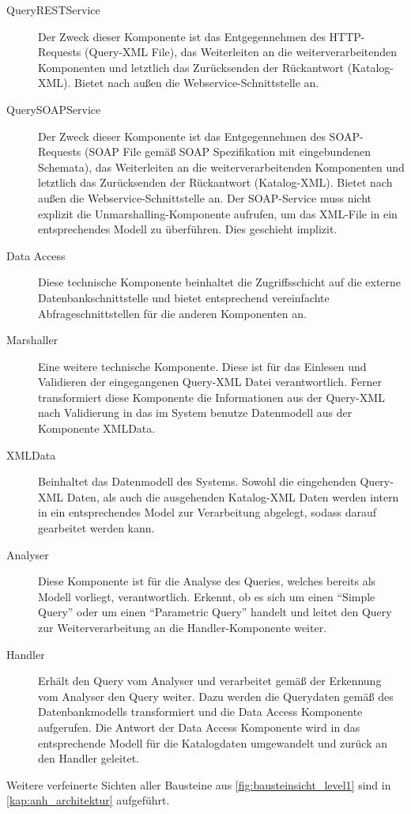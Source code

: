 \begin{description}
\item[QueryRESTService] Der Zweck dieser Komponente ist das Entgegennehmen des HTTP-Requests (Query-XML File), das Weiterleiten an die weiterverarbeitenden Komponenten und letztlich das Zurücksenden der Rückantwort (Katalog-XML). Bietet nach außen die \gls{Webservice}-Schnittstelle an.
\item[QuerySOAPService] Der Zweck dieser Komponente ist das Entgegennehmen des SOAP-Requests (SOAP File gemäß SOAP Spezifikation mit eingebundenen Schemata), das Weiterleiten an die weiterverarbeitenden Komponenten und letztlich das Zurücksenden der Rückantwort (Katalog-XML). Bietet nach außen die \gls{Webservice}-Schnittstelle an.
Der SOAP-Service muss nicht explizit die Unmarshalling-Komponente aufrufen, um das XML-File in ein entsprechendes Modell zu überführen. Dies geschieht implizit. 
\item[Data Access] Diese technische Komponente beinhaltet die Zugriffsschicht auf die externe Datenbankschnittstelle und bietet entsprechend vereinfachte Abfrageschnittstellen für die anderen Komponenten an. 
\item[Marshaller] Eine weitere technische Komponente. Diese ist für das Einlesen und Validieren der eingegangenen Query-XML Datei verantwortlich. Ferner transformiert diese Komponente die Informationen aus der Query-XML nach Validierung in das im System benutze Datenmodell aus der Komponente XMLData.
\item[XMLData] Beinhaltet das Datenmodell des Systems. Sowohl die eingehenden Query-XML Daten, als auch die ausgehenden Katalog-XML Daten werden intern in ein entsprechendes Model zur Verarbeitung abgelegt, sodass darauf gearbeitet werden kann.  
\item[Analyser] Diese Komponente ist für die Analyse des Queries, welches bereits als Modell vorliegt, verantwortlich. Erkennt, ob es sich um einen \enquote{Simple Query} oder um einen \enquote{Parametric Query} handelt und leitet den Query zur Weiterverarbeitung an die Handler-Komponente weiter. 
\item[Handler] Erhält den Query vom Analyser und verarbeitet gemäß der Erkennung vom Analyser den Query weiter. Dazu werden die Querydaten gemäß des Datenbankmodells transformiert und die Data Access Komponente aufgerufen. Die Antwort der Data Access Komponente wird in das entsprechende Modell für die Katalogdaten umgewandelt und zurück an den Handler geleitet.  
\end{description}

Weitere verfeinerte Sichten aller Bausteine aus \autoref{fig:bausteinsicht_level1} sind in \autoref{kap:anh_architektur} aufgeführt. 
